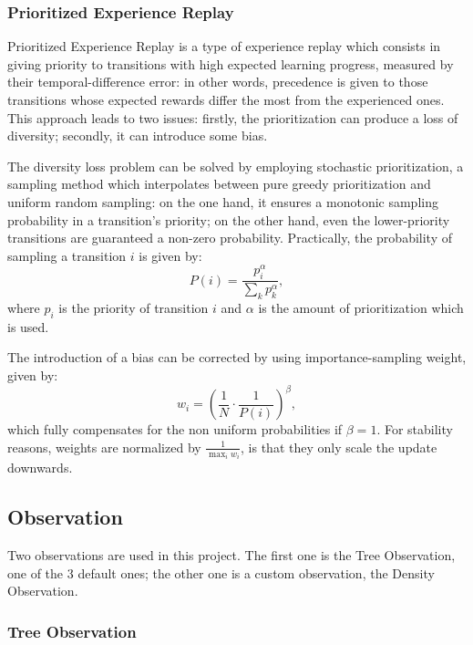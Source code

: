 \documentclass[a4paper, 12pt]{article}
\numberwithin{equation}{section}
\begin{document}
\subsubsection[Prioritized Experience Replay]{Prioritized Experience Replay \cite{prioritized-experience-replay}}
Prioritized Experience Replay is a type of experience replay which consists in giving priority to transitions with high expected learning progress, measured by their temporal-difference error: in other words, precedence is given to those transitions whose expected rewards differ the most from the experienced ones. This approach leads to two issues: firstly, the prioritization can produce a loss of diversity; secondly, it can introduce some bias.

The diversity loss problem can be solved by employing stochastic prioritization, a sampling method which interpolates between pure greedy prioritization and uniform random sampling: on the one hand, it ensures a monotonic sampling probability in a transition's priority; on the other hand, even the lower-priority transitions are guaranteed a non-zero probability. Practically, the probability of sampling a transition $i$ is given by:
\begin{equation}
	P\left(i\right)=\frac{p_i^\alpha}{\sum_kp_k^\alpha},
\end{equation}
where $p_i$ is the priority of transition $i$ and $\alpha$ is the amount of prioritization which is used.

The introduction of a bias can be corrected by using importance-sampling weight, given by:
\begin{equation}
	w_i=\left(\frac{1}{N}\cdot\frac{1}{P\left(i\right)}\right)^\beta,
\end{equation}
which fully compensates for the non uniform probabilities if $\beta=1$. For stability reasons, weights are normalized by $\frac{1}{\max_iw_i}$, is that they only scale the update downwards.


\subsection{Observation}
Two observations are used in this project. The first one is the Tree Observation, one of the 3 default ones; the other one is a custom observation, the Density Observation.


\subsubsection[Tree Observation]{Tree Observation \cite{observations}}\label{sec:tree-observation}
\end{document}
